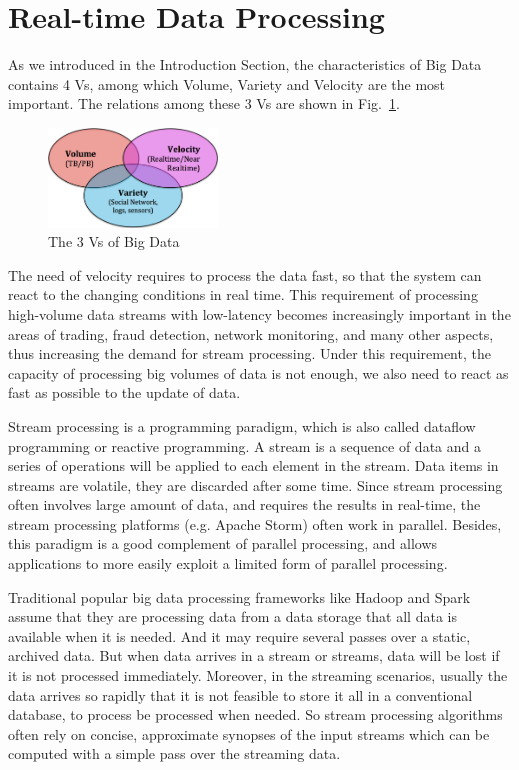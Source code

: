\documentclass[	DIV=calc,%
							paper=a4,%
							fontsize=11pt,%
							twocolumn]{scrartcl}	 					%
\newcommand{\initial}[1]{%
     \lettrine[lines=3,lhang=0.3,nindent=0em]{
     				\color{DarkBlue}
     				{\textsf{#1}}}{}}
\begin{document}
\section*{\color{DarkOrange} Real-time Data Processing}

\initial{A}s we introduced in the Introduction Section, the characteristics of Big Data contains 4 Vs, among which Volume, Variety and Velocity are the most important. The relations among these 3 Vs are shown in Fig.~\ref{fig:3v}.

\begin{figure}
  \centering
    \includegraphics[width=0.4\textwidth]{images/3v.png}
    \caption{The 3 Vs of Big Data}
    \label{fig:3v}   
\end{figure}

The need of velocity requires to process the data fast, so that the system can react to the changing conditions in  real time. This requirement of processing high-volume data streams with low-latency becomes increasingly important in the areas of trading, fraud detection, network monitoring, and many other aspects, thus increasing the demand for stream processing. Under this requirement, the capacity of processing big volumes of data is not enough, we also need to react as fast as possible to the update of data.

Stream processing is a programming paradigm, which is also called dataflow programming or reactive programming. A stream is a sequence of data and a series of operations will be applied to each element in the stream. Data items in streams are volatile, they are discarded after some time. Since stream processing often involves large amount of data, and requires the results in real-time, the stream processing platforms (e.g. Apache Storm) often work in parallel. Besides, this paradigm is a good complement of parallel processing, and allows applications to more easily exploit a limited form of parallel processing.  

Traditional popular big data processing frameworks like Hadoop and Spark assume that they are processing data from a data storage that all data is available when it is needed. And it may require several passes over a static, archived data. But when data arrives in a stream or streams, data will be lost if it is not processed immediately. Moreover, in the streaming scenarios, usually the data arrives so rapidly that it is not feasible to store it all in a conventional database, to process be processed when needed. So stream processing algorithms often rely on concise, approximate synopses of the input streams which can be computed with a simple pass over the streaming data.
\end{document}
